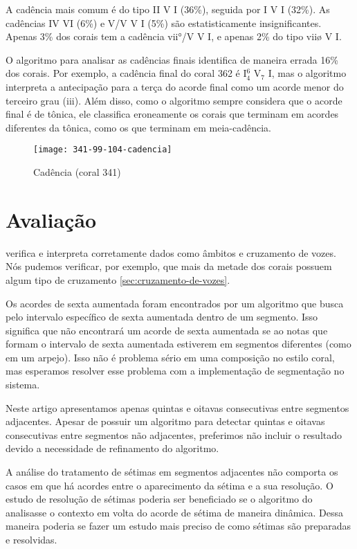 A cadência mais comum é do tipo II V I (36\%), seguida por I V I
(32\%). As cadências IV VI (6\%) e V/V V I (5\%) são estatisticamente
insignificantes. Apenas 3\% dos corais tem a cadência vii°/V V I, e
apenas 2\% do tipo viiø V I.

O algoritmo para analisar as cadências finais identifica de maneira
errada 16\% dos corais. Por exemplo, a cadência final do coral 362 é
I$^6_4$ V$_7$ I, mas o algoritmo interpreta a antecipação para a terça
do acorde final como um acorde menor do terceiro grau (iii). Além
disso, como o algoritmo sempre considera que o acorde final é de
tônica, ele classifica eroneamente os corais que terminam em acordes
diferentes da tônica, como os que terminam em meia-cadência.

\begin{figure}
  \centering
  \texttt{[image: 341-99-104-cadencia]}
  \caption{Cadência (coral 341)}
  \label{fig:cadencia}
\end{figure}

\section{Avaliação}
\label{sec:avaliacao}

\rameau{} verifica e interpreta corretamente dados como âmbitos e
cruzamento de vozes. Nós pudemos verificar, por exemplo, que mais da
metade dos corais possuem algum tipo de cruzamento
\ref{sec:cruzamento-de-vozes}.

Os acordes de sexta aumentada foram encontrados por um algoritmo que
busca pelo intervalo específico de sexta aumentada dentro de um
segmento. Isso significa que \rameau{} não encontrará um acorde de
sexta aumentada se ao notas que formam o intervalo de sexta aumentada
estiverem em segmentos diferentes (como em um arpejo). Isso não é
problema sério em uma composição no estilo coral, mas esperamos
resolver esse problema com a implementação de segmentação no sistema.

Neste artigo apresentamos apenas quintas e oitavas consecutivas entre
segmentos adjacentes. Apesar de \rameau{} possuir um algoritmo para
detectar quintas e oitavas consecutivas entre segmentos não
adjacentes, preferimos não incluir o resultado devido a necessidade de
refinamento do algoritmo.

A análise do tratamento de sétimas em segmentos adjacentes não
comporta os casos em que há acordes entre o aparecimento da sétima e a
sua resolução. O estudo de resolução de sétimas poderia ser
beneficiado se o algoritmo do \rameau{} analisasse o contexto em volta
do acorde de sétima de maneira dinâmica. Dessa maneira poderia se
fazer um estudo mais preciso de como sétimas são preparadas e
resolvidas.

